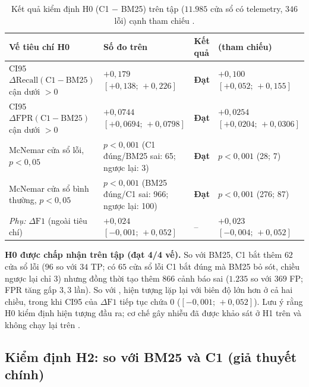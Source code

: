 \begin{table}[htbp]
  \centering
  \caption[Kiểm định giả thuyết H0 trên tập test]{Kết quả kiểm định H0 (C1 $-$ BM25) trên tập  ($11.985$ cửa sổ có telemetry, $346$ lỗi) cạnh tham chiếu .}
  \label{tab:ch5-test-h0}
  \scriptsize
  \renewcommand{\arraystretch}{1.15}
  \setlength{\tabcolsep}{3pt}
  \begin{tabularx}{\linewidth}{@{}Y >{\raggedright\arraybackslash}p{4.6cm} l >{\raggedright\arraybackslash}p{3.1cm}@{}}
    \toprule
    \textbf{Vế tiêu chí H0} & \textbf{Số đo trên } & \textbf{Kết quả} & \textbf{ (tham chiếu)} \\
    \midrule
    CI95 $\Delta\text{Recall}(\text{C1}-\text{BM25})$ cận dưới $> 0$ & $+0{,}179$ $[+0{,}138;\, +0{,}226]$ & \textbf{Đạt} & $+0{,}100$ $[+0{,}052;\, +0{,}155]$ \\
    CI95 $\Delta\text{FPR}(\text{C1}-\text{BM25})$ cận dưới $> 0$ & $+0{,}0744$ $[+0{,}0694;\, +0{,}0798]$ & \textbf{Đạt} & $+0{,}0254$ $[+0{,}0204;\, +0{,}0306]$ \\
    McNemar cửa sổ lỗi, $p < 0{,}05$ & $p < 0{,}001$ (C1 đúng/BM25 sai: 65; ngược lại: 3) & \textbf{Đạt} & $p < 0{,}001$ (28; 7) \\
    McNemar cửa sổ bình thường, $p < 0{,}05$ & $p < 0{,}001$ (BM25 đúng/C1 sai: 966; ngược lại: 100) & \textbf{Đạt} & $p < 0{,}001$ (276; 87) \\
    \emph{Phụ:} $\Delta\text{F1}$ (ngoài tiêu chí) & $+0{,}024$ $[-0{,}001;\, +0{,}052]$ & -- & $+0{,}023$ $[-0{,}004;\, +0{,}052]$ \\
    \bottomrule
  \end{tabularx}
\end{table}

\textbf{H0 được chấp nhận trên tập  (đạt 4/4 vế).} So với BM25, C1 bắt thêm $62$ cửa sổ lỗi ($96$ so với $34$ TP; có $65$ cửa sổ lỗi C1 bắt đúng mà BM25 bỏ sót, chiều ngược lại chỉ $3$) nhưng đồng thời tạo thêm $866$ cảnh báo sai ($1.235$ so với $369$ FP; FPR tăng gấp $3{,}3$ lần). So với , hiện tượng lặp lại với biên độ lớn hơn ở cả hai chiều, trong khi CI95 của $\Delta\text{F1}$ tiếp tục chứa $0$ ($[-0{,}001;\, +0{,}052]$). Lưu ý rằng H0 kiểm định hiện tượng đầu ra; cơ chế gây nhiễu đã được khảo sát ở H1 trên  và không chạy lại trên .

\subsection{Kiểm định H2: \CTAV{} so với BM25 và C1 (giả thuyết chính)}
\label{sec:ch5-test-h2}

